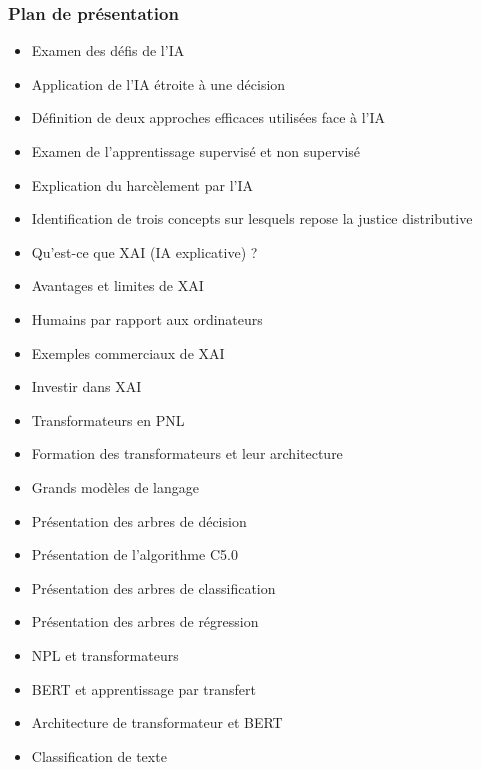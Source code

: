 \documentclass{beamer}
\begin{document}
\begin{frame}
	\frametitle{Plan de présentation}
	\begin{itemize}
		\item Examen des défis de l'IA
		\item Application de l'IA étroite à une décision
		\item Définition de deux approches efficaces utilisées face à l'IA
		\item Examen de l'apprentissage supervisé et non supervisé
		\item Explication du harcèlement par l'IA
		\item Identification de trois concepts sur lesquels repose la justice distributive
		\item Qu'est-ce que XAI (IA explicative) ?
		\item Avantages et limites de XAI
		\item Humains par rapport aux ordinateurs
		\item Exemples commerciaux de XAI
		\item Investir dans XAI
		\item Transformateurs en PNL
		\item Formation des transformateurs et leur architecture
		\item Grands modèles de langage
		\item Présentation des arbres de décision
		\item Présentation de l'algorithme C5.0
		\item Présentation des arbres de classification
		\item Présentation des arbres de régression
		\item NPL et transformateurs
		\item BERT et apprentissage par transfert
		\item Architecture de transformateur et BERT
		\item Classification de texte
	\end{itemize}
\end{frame}
\end{document}
